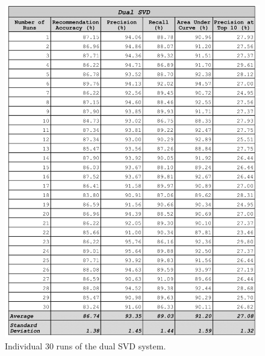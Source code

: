 \begin{appendices}
\begin{figure}
\centering
\includegraphics[scale=0.3]{appendices/dual_als_30_runs.png}
\caption{Individual 30 runs of the dual SVD system. }
\label{fig:dual_algorithm}
\end{figure}


\end{appendices}
